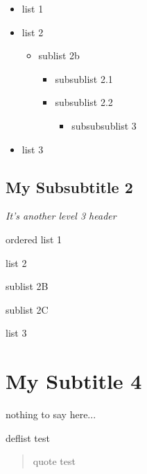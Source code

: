 \documentclass[openany]{book} %
\begin{document}
\begin{itemize}
\item list 1
\item list 2
 \begin{itemize}
 \item sublist 2b
  \begin{itemize}
  \item subsublist 2.1
  \item subsublist 2.2
   \begin{itemize}
   \item subsubsublist 3
   \end{itemize}
  \end{itemize}
 \end{itemize}
\item list 3
\end{itemize}

\hypertarget{toc22}{}
\pagebreak[\PAGExSUBxBREAKxPOLICY]
\section{My Subsubtitle 2}

\textit{It's another level 3 header} 

\begin{compactenum}
\item ordered list 1
\item list 2
 \begin{compactenum}
 \item sublist 2B
 \item sublist 2C
 \end{compactenum}
\item list 3
\end{compactenum}

\hypertarget{toc23}{}
\pagebreak[\PAGExBREAKxPOLICY]
\chapter{My Subtitle 4}

nothing to say here...

\begin{description}
\item[deflist test]

\end{description}

	\begin{quotation}
quote test
	\end{quotation}

\hrulefill{}

\clearpage

\end{document}
